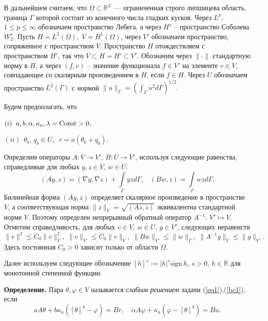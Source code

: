 \documentclass[12pt]{article}
\begin{document}
    В дальнейшем считаем, что $\Omega\subset \mathbb{R}^3$~--- ограниченная строго липшицева
    область, граница $\Gamma$ которой состоит из конечного числа
    гладких кусков.
    Через $L^p$, $1 \leq p \leq \infty$ обозначаем
    пространство Лебега, а через $H^s$ -- пространство Соболева
    $W^s_2$.
    Пусть $H = L^2(\Omega), \; V = H^1(\Omega)$, через $V'$ обозначаем
    пространство, сопряженное с пространством $V$.
    Пространство $H$
    отождествляем с пространством $H'$, так что $V \subset H = H'
    \subset V'$.
    Обозначим через $\|\cdot\|$ стандартную норму
    в $H$, а через
    $(f,v)$ -- значение функционала $f\in V'$ на элементе $v\in V$,
    совпадающее со скалярным произведением в $H$, если $f\in H$.
    Через $U$ обозначаем пространство $L^2(\Gamma)$ с нормой
    $\|u\|_\Gamma=\left(\int_\Gamma u^2d\Gamma\right)^{1/2}.$



    Будем предполагать, что

    $(i) \;\; a,b,\alpha,\kappa_a, \lambda
    ={\rm Const}> 0 ,$

    $(ii) \;\, \theta_b, \,q_b \in U,\;\; r=a(\theta_b+q_b).$


    Определим операторы $A\colon V \to V'$, $B\colon U \to V'$, используя
    следующие равенства, справедливые для любых $y,z \in V$, $w\in U$:
    $$
    (Ay,z) = (\nabla y, \nabla z) +
    \int\limits_{\Gamma}yz d\Gamma, \;\;\; (Bw, z)
    = \int\limits_{\Gamma}wz d\Gamma.
    $$
    Билинейная форма $(Ay,z)$ определяет скалярное произведение
    в пространстве $V$, а соответствующая норма $\|z\|_V=\sqrt{(Az,z)}$ эквивалентна
    стандартной норме $V$.
    Поэтому определен непрерывный обратный оператор
    $A^{-1}:\,V'\mapsto V.$ Отметим справедливость, для любых
    $v\in V$, $w\in U$, $g\in V'$,
    следующих неравенств
    \begin{equation}
        \label{E}
        \|v\|^2\leq C_0\|v\|^2_V,\; \|v\|_{V'}\leq C_0\|v\|_V,\; \|Bw\|_{V'}\leq \|w\|_\Gamma,\;
        \|A^{-1}g\|_{V}\leq \|g\|_{V'}.
    \end{equation}
    Здесь постоянная $C_0>0$ зависит только от области $\Omega.$




    Далее используем следующее обозначение
    $[h]^s := |h|^s \mathrm{sign}\, h$,
    $s > 0$, $h \in \mathbb R$ для монотонной степенной функции.


        {\bf Определение.} Пара $\theta, \varphi\in V$
    называется {\it слабым решением} задачи (\ref{eq1}),(\ref{bc1}), если
    \begin{equation}
        \label{w1}
        a A \theta + b \kappa_a ([\theta]^4 - \varphi ) = Br,\quad
        \alpha A \varphi + \kappa_a (\varphi - [\theta]^4)  = Bu.
    \end{equation}
\end{document}
